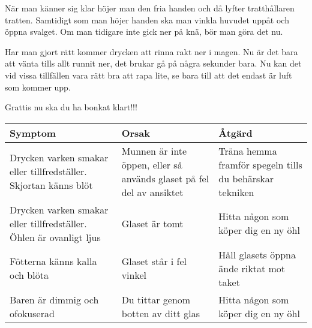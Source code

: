 När man känner sig klar höjer man den fria handen och då lyfter tratthållaren tratten. Samtidigt som man höjer handen ska man vinkla huvudet uppåt och öppna svalget. Om man tidigare inte gick ner på knä, bör man göra det nu.

Har man gjort rätt kommer drycken att rinna rakt ner i magen. Nu är det bara att vänta tills allt runnit ner, det brukar gå på några sekunder bara. Nu kan det vid vissa tillfällen vara rätt bra att rapa lite, se bara till att det endast är luft som kommer upp.

Grattis nu ska du ha bonkat klart!!!


\begin{adjustbox}{angle=-90}
  \begin{tabular}{|p{0.3\textheight}|p{0.3\textheight}|p{0.3\textheight}|}
    \hline
    \textbf{Symptom}                                                     & \textbf{Orsak} & \textbf{Åtgärd} \\
    \hline
    Drycken varken smakar eller tillfredställer. Skjortan känns blöt     &
    Munnen är inte öppen, eller så används glaset på fel del av ansiktet    &
    Träna hemma framför spegeln tills du behärskar tekniken                                                 \\
    \hline
    Drycken varken smakar eller tillfredställer. Öhlen är ovanligt ljus &
    Glaset är tomt                                                       &
    Hitta någon som köper dig en ny öhl                                                                     \\
    \hline
    Fötterna känns kalla och blöta                                       &
    Glaset står i fel vinkel                                             &
    Håll glasets öppna ände riktat mot taket                                                                \\
    \hline
    Baren är dimmig och ofokuserad                                       &
    Du tittar genom botten av ditt glas                                  &
    Hitta någon som köper dig en ny öhl                                                                     \\
    \hline
  \end{tabular}
\end{adjustbox}

